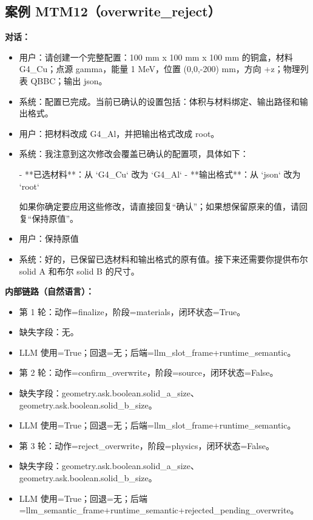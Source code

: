 \documentclass[11pt]{ctexart}
\begin{document}
\subsection{案例 MTM12（overwrite\_reject）}
\textbf{对话：}
\begin{itemize}
\item 用户：请创建一个完整配置：100 mm x 100 mm x 100 mm 的铜盒，材料 G4\_Cu；点源 gamma，能量 1 MeV，位置 (0,0,-200) mm，方向 +z；物理列表 QBBC；输出 json。
\item 系统：配置已完成。当前已确认的设置包括：体积与材料绑定、输出路径和输出格式。
\item 用户：把材料改成 G4\_Al，并把输出格式改成 root。
\item 系统：我注意到这次修改会覆盖已确认的配置项，具体如下：

- **已选材料**：从 `G4\_Cu` 改为 `G4\_Al`
- **输出格式**：从 `json` 改为 `root`

如果你确定要应用这些修改，请直接回复“确认”；如果想保留原来的值，请回复“保持原值”。
\item 用户：保持原值
\item 系统：好的，已保留已选材料和输出格式的原有值。接下来还需要你提供布尔 solid A 和布尔 solid B 的尺寸。
\end{itemize}
\textbf{内部链路（自然语言）：}
\begin{itemize}
\item 第 1 轮：动作=finalize，阶段=materials，闭环状态=True。
\item 缺失字段：无。
\item LLM 使用=True；回退=无；后端=llm\_slot\_frame+runtime\_semantic。
\item 第 2 轮：动作=confirm\_overwrite，阶段=source，闭环状态=False。
\item 缺失字段：geometry.ask.boolean.solid\_a\_size、geometry.ask.boolean.solid\_b\_size。
\item LLM 使用=True；回退=无；后端=llm\_slot\_frame+runtime\_semantic。
\item 第 3 轮：动作=reject\_overwrite，阶段=physics，闭环状态=False。
\item 缺失字段：geometry.ask.boolean.solid\_a\_size、geometry.ask.boolean.solid\_b\_size。
\item LLM 使用=True；回退=无；后端=llm\_semantic\_frame+runtime\_semantic+rejected\_pending\_overwrite。
\end{itemize}
\end{document}
